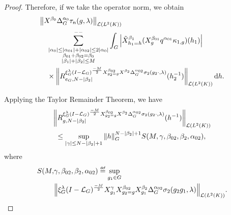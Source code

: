 \begin{proof}
    Therefore,
    if we take the operator norm,
    we obtain
    \begin{align*}
        &\norm [\Lin {\Lebesgue 2 \CompactGroup}] {\LeftDifferentialOperator {\beta_0} \DifferenceOperatorOrder {\alpha_0} \tau_n(g, \lambda)}\\
        &\quad \lcsum{%
            \substack{%
                \abs{\alpha_0} \leq \abs{\alpha_{01}} + \abs{\alpha_{02}} \leq 2 \abs{\alpha_0}\\
                \beta_{01} + \beta_{02} = \beta_0\\
                \abs {\beta_1} + \abs {\beta_2} \leq M
            }
        }
        \int_\Group \abs {\RightDifferentialOperator[h_1 = h] {\beta_1} (\LeftDifferentialOperator [g] {\beta_{01}} q^{\alpha_{01}} \kappa_{1, g})(h_1)}\\
        &\quad \times
        \norm [\Lin {\Lebesgue 2 \CompactGroup}] {%
            \TaylorRemainder {\Rep \lambda \BesselPotential {-M} \LeftDifferentialOperator [g_2 = g] {\beta_{02}} \LeftDifferentialOperator {\beta_2} \DifferenceOperatorOrder {\alpha_{02}} \sigma_2(g_2 \dummy, \lambda)} {e_\Group} {N - \abs {\beta_2}} (h_2^{-1})
        } \dd h.
    \end{align*}

    Applying the Taylor Remainder Theorem,
    we have
    \begin{align*}
        &\norm [\Lin {\Lebesgue 2 \CompactGroup}] {\TaylorRemainder {\Rep \lambda \BesselPotential {-M} \LeftDifferentialOperator [g_2 = g] {\beta_{02}} \LeftDifferentialOperator {\beta_2} \DifferenceOperatorOrder {\alpha_{02}} \sigma_2(g_2 \dummy, \lambda)} g {N - \abs {\beta_2}} (h^{-1})}\\
        &\ \leq
        \sup_{\abs \gamma \leq N - \abs {\beta_2} + 1}
        \norm [\Group] h^{N - \abs {\beta_2} + 1}
        S(M, \gamma, \beta_{02}, \beta_2, \alpha_{02}),
    \end{align*}
    where
    \begin{align*}
        S(M, &\gamma, \beta_{02}, \beta_2, \alpha_{02}) \defeq
        \sup_{g_1 \in \Group}\\
        &\norm [\Lin {\Lebesgue 2 \CompactGroup}] {%
            \Rep \lambda \BesselPotential {-M}
            \LeftDifferentialOperator [g_1] {\gamma}
            \LeftDifferentialOperator [g_2 = g] {\beta_{02}}
            \LeftDifferentialOperator [g_1] {\beta_2}
            \DifferenceOperatorOrder {\alpha_{02}}
            \sigma_2(g_2 g_1, \lambda)
        }.
    \end{align*}


\end{proof}
